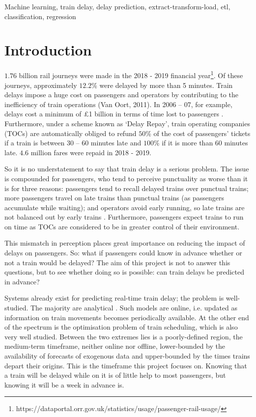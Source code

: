 \documentclass[12pt,a4paper]{article}
\begin{document}
\begin{keywords}
Machine learning, train delay, delay prediction, extract-transform-load, etl, classification, regression
\end{keywords}

\clearpage
\section{Introduction}

$1.76$ billion rail journeys were made in the 2018 - 2019 financial year\footnote{https://dataportal.orr.gov.uk/statistics/usage/passenger-rail-usage/}. Of these journeys, approximately $12.2$\% were delayed by more than 5 minutes. Train delays impose a huge cost on passengers and operators by contributing to the inefficiency of train operations (Van Oort, 2011). In 2006 – 07, for example, delays cost a minimum of £1 billion in terms of time lost to passengers \cite{nao_2008}. Furthermore, under a scheme known as ‘Delay Repay’, train operating companies (TOCs) are automatically obliged to refund $50\%$ of the cost of passengers’ tickets if a train is between 30 – 60 minutes late and $100\%$ if it is more than 60 minutes late. $4.6$ million fares were repaid in 2018 - 2019.

So it is no understatement to say that train delay is a serious problem. The issue is compounded for passengers, who tend to perceive punctuality as worse than it is for three reasons: passengers tend to recall delayed trains over punctual trains; more passengers travel on late trains than punctual trains (as passengers accumulate while waiting); and operators avoid early running, so late trains are not balanced out by early trains \cite[p.~130]{harris_godward_1992}. Furthermore, passengers expect trains to run on time as TOCs are considered to be in greater control of their environment.

This mismatch in perception places great importance on reducing the impact of delays on passengers. So: what if passengers could know in advance whether or not a train would be delayed? The aim of this project is not to answer this questions, but to see whether doing so is possible: can train delays be predicted in advance? 

Systems already exist for predicting real-time train delay; the problem is well-studied. The majority are analytical \cite{oneto_et_al_2016}. Such models are online, i.e. updated as information on train movements becomes periodically available. At the other end of the spectrum is the optimisation problem of train scheduling, which is also very well studied. Between the two extremes lies is a poorly-defined region, the medium-term timeframe, neither online nor offline, lower-bounded by the availability of forecasts of exogenous data and upper-bounded by the times trains depart their origins. This is the timeframe this project focuses on. Knowing that a train will be delayed while on it is of little help to most passengers, but knowing it will be a week in advance is. 
\end{document}
